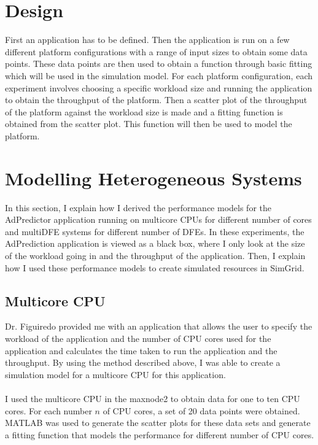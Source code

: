 \documentclass[a4paper,11pt]{article}
\begin{document}
\section{Design}

First an application has to be defined. Then the application is run on a few different platform configurations with a range of input sizes to obtain some data points. These data points are then used to obtain a function through basic fitting which will be used in the simulation model. For each platform configuration, each experiment involves choosing a specific workload size and running the application to obtain the throughput of the platform. Then a scatter plot of the throughput of the platform against the workload size is made and a fitting function is obtained from the scatter plot. This function will then be used to model the platform. 

\section{Modelling Heterogeneous Systems}

In this section, I explain how I derived the performance models for the AdPredictor application running on multicore CPUs for different number of cores and multiDFE systems for different number of DFEs. In these experiments, the AdPrediction application is viewed as a black box, where I only look at the size of the workload going in and the throughput of the application. Then, I explain how I used these performance models to create simulated resources in SimGrid.

\subsection{Multicore CPU}
Dr. Figuiredo provided me with an application that allows the user to specify the workload of the application and the number of CPU cores used for the application and calculates the time taken to run the application and the throughput. By using the method described above, I was able to create a simulation model for a multicore CPU for this application.
\\\\
I used the multicore CPU in the maxnode2 to obtain data for one to ten CPU cores. For each number $n$ of CPU cores, a set of 20 data points were obtained. MATLAB was used to generate the scatter plots for these data sets and generate a fitting function that models the performance for different number of CPU cores.
\end{document}
